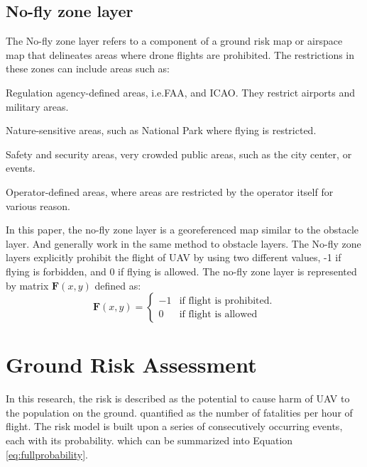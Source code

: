 \documentclass[12pt]{report}
\begin{document}
        \subsection{No-fly zone layer}
            The No-fly zone layer refers to a component of a ground risk map or airspace map that delineates areas where
            drone flights are prohibited. The restrictions in these zones can include areas such as:
            \begin{myitemize}
                \item Regulation agency-defined areas, i.e.\ac{FAA}, and \ac{ICAO}. They restrict airports and military areas.
                \item Nature-sensitive areas, such as National Park where flying is restricted.
                \item Safety and security areas, very crowded public areas, such as the city center, or events.
                \item Operator-defined areas, where areas are restricted by the operator itself for various reason. 
            \end{myitemize}

            In this paper, the no-fly zone layer is a georeferenced map similar to the obstacle layer. And generally
            work in the same method to obstacle layers. The No-fly zone layers explicitly prohibit the flight of UAV by
            using two different values, -1 if flying is forbidden, and 0 if flying is allowed. The no-fly zone layer is
            represented by matrix \(\mathbf{F}(x, y)\) defined as:
            \begin{equation}
                \mathbf{F}(x, y) = 
                \begin{cases}    
                    -1 & \text{if flight is prohibited.} \\
                    0 & \text{if flight is allowed}
                \end{cases}
            \end{equation}

    \section{Ground Risk Assessment}
        In this research, the risk is described as the potential to cause harm of UAV to the population on the ground.
        quantified as the number of fatalities per hour of flight. The risk model is built upon a series of
        consecutively occurring events, each with its probability. which can be summarized into Equation
        \ref{eq:fullprobability}.
        
\end{document}
